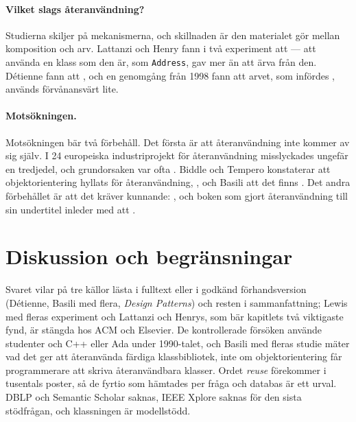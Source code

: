 \paragraph{Vilket slags återanvändning?}  Studierna skiljer på
mekanismerna, och skillnaden är den materialet gör mellan komposition och
arv.  Lattanzi och Henry fann i två experiment att
 ---
att använda en klass som den är, som \texttt{Address}, gav
mer än att ärva från den.  Détienne fann att
, och en genomgång från 1998 fann att arvet,
som infördes , används förvånansvärt lite.

\paragraph{Motsökningen.}  Motsökningen bär två förbehåll.  Det första
är att återanvändning inte kommer av sig själv.  I 24 europeiska
industriprojekt för återanvändning misslyckades ungefär en tredjedel, och
grundorsaken var ofta .  Biddle och
Tempero konstaterar att objektorientering hyllats för återanvändning,
, och Basili att det finns
.  Det andra förbehållet är att det kräver kunnande:
, och boken som gjort återanvändning
till sin undertitel inleder med att
.

\section{Diskussion och begränsningar}
\label{sec:ater-diskussion}

Svaret vilar på tre källor lästa i fulltext eller i godkänd
förhandsversion (Détienne, Basili med flera, \emph{Design Patterns}) och
resten i sammanfattning; Lewis med fleras experiment och Lattanzi och
Henrys, som bär kapitlets två viktigaste fynd, är stängda hos ACM och
Elsevier.  De kontrollerade försöken använde studenter och C++ eller Ada
under 1990-talet, och Basili med fleras studie mäter vad det ger att
återanvända färdiga klassbibliotek, inte om objektorientering får
programmerare att skriva återanvändbara klasser.  Ordet \emph{reuse}
förekommer i tusentals poster, så de fyrtio som hämtades per fråga och
databas är ett urval.  DBLP och Semantic Scholar saknas, IEEE Xplore
saknas för den sista stödfrågan, och klassningen är modellstödd.

